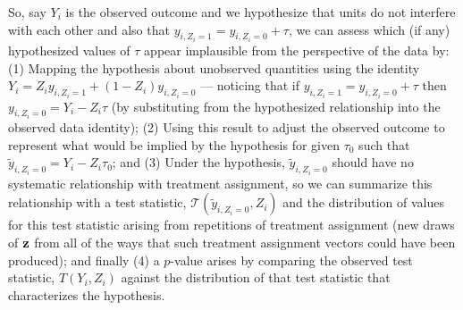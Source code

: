 So, say $Y_i$ is the observed outcome and we hypothesize that units do not
interfere with each other and also that $y_{i,Z_i=1}=y_{i,Z_i=0}+\tau$, we can
assess which (if any) hypothesized values of $\tau$ appear implausible from
the perspective of the data by: (1) Mapping the hypothesis about unobserved
quantities using the identity $Y_i=Z_i y_{i,Z_i=1} + (1-Z_i) y_{i,Z_i=0}$ ---
noticing that if $y_{i,Z_i=1}=y_{i,Z_i=0}+\tau$ then $y_{i,Z_i=0}=Y_i - Z_i
\tau$ (by substituting from the hypothesized relationship into the observed
data identity); (2) Using this result to adjust the observed outcome to
represent what would be implied by the hypothesis for given $\tau_0$ such that
$\widetilde y_{i,Z_i=0}=Y_i - Z_i \tau_0$; and (3) Under the hypothesis,
$\widetilde y_{i,Z_i=0}$ should have no systematic relationship with treatment
assignment, so we can summarize this relationship with a test statistic,
$\mathcal T(\widetilde y_{i,Z_i=0},Z_i)$ and the distribution of values for
this test statistic arising from repetitions of treatment assignment (new
draws of $\mathbf{z}$ from all of the ways that such treatment assignment vectors
could have been produced); and finally (4) a $p$-value arises by comparing the
observed test statistic, $T(Y_i,Z_i)$ against the distribution of that test
statistic that characterizes the hypothesis.

